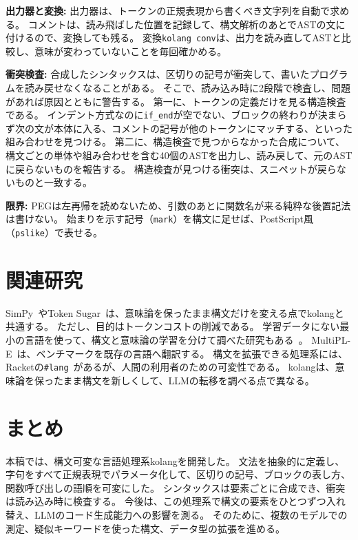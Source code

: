 \documentclass{ipsjprosym}
\begin{document}
\textbf{出力器と変換:}
出力器は、トークンの正規表現から書くべき文字列を自動で求める。
コメントは、読み飛ばした位置を記録して、構文解析のあとでASTの文に付けるので、変換しても残る。
変換\verb|kolang conv|は、出力を読み直してASTと比較し、意味が変わっていないことを毎回確かめる。

\textbf{衝突検査:}
合成したシンタックスは、区切りの記号が衝突して、書いたプログラムを読み戻せなくなることがある。
そこで、読み込み時に2段階で検査し、問題があれば原因とともに警告する。
第一に、トークンの定義だけを見る構造検査である。
インデント方式なのに\verb|if_end|が空でない、ブロックの終わりが決まらず次の文が本体に入る、コメントの記号が他のトークンにマッチする、といった組み合わせを見つける。
第二に、構造検査で見つからなかった合成について、構文ごとの単体や組み合わせを含む40個のASTを出力し、読み戻して、元のASTに戻らないものを報告する。
構造検査が見つける衝突は、スニペットが戻らないものと一致する。

\textbf{限界:}
PEGは左再帰を読めないため、引数のあとに関数名が来る純粋な後置記法は書けない。
始まりを示す記号（\verb|mark|）を構文に足せば、PostScript風（\verb|pslike|）で表せる。

\section{関連研究}
\label{sec:related}

SimPy~\cite{Sun2024SimPy}やToken Sugar~\cite{Sun2025TokenSugar}は、意味論を保ったまま構文だけを変える点でkolangと共通する。
ただし、目的はトークンコストの削減である。
学習データにない最小の言語を使って、構文と意味論の学習を分けて調べた研究もある~\cite{Kumar2026PyLang}。
MultiPL-E~\cite{Cassano2023MultiPLE}は、ベンチマークを既存の言語へ翻訳する。
構文を拡張できる処理系には、Racketの\verb|#lang|~\cite{Tobin2011Libraries}があるが、人間の利用者のための可変性である。
kolangは、意味論を保ったまま構文を新しくして、LLMの転移を調べる点で異なる。

\section{まとめ}

本稿では、構文可変な言語処理系kolangを開発した。
文法を抽象的に定義し、字句をすべて正規表現でパラメータ化して、区切りの記号、ブロックの表し方、関数呼び出しの語順を可変にした。
シンタックスは要素ごとに合成でき、衝突は読み込み時に検査する。
今後は、この処理系で構文の要素をひとつずつ入れ替え、LLMのコード生成能力への影響を測る。
そのために、複数のモデルでの測定、疑似キーワードを使った構文、データ型の拡張を進める。
\end{document}
